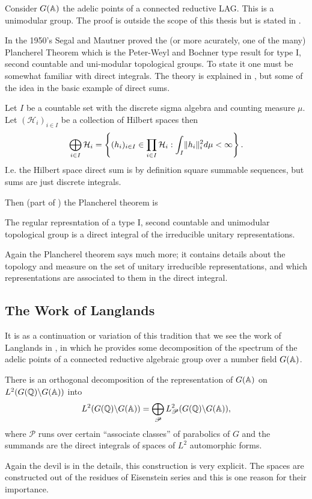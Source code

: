\begin{example}
	Consider \(G(\A)\) the adelic points of a connected reductive LAG. This is a unimodular group. The proof is outside the scope of this thesis but is stated in \cite[Lem. 2]{conradCOMPACTNESSVOLUMEADELIC}.
\end{example}

In the 1950's Segal and Mautner proved the (or more acurately, one of the many) Plancherel Theorem which is the Peter-Weyl and Bochner type result for type I, second countable and uni-modular topological groups. To state it one must be somewhat familiar with direct integrals. The theory is explained in \cite[7.4]{follandCourseAbstractHarmonic2016a}, but some of the idea in the basic example of direct sums.
\begin{example}
	Let \(I\) be a countable set with the discrete sigma algebra and counting measure \(\mu\). Let \((\mathcal{H}_i)_{i\in I}\) be a collection of Hilbert spaces then
	\[\bigoplus_{i\in I} \mathcal{H}_i = \left\{ (h_i)_{i\in I}\in \prod_{i\in I} \mathcal{H}_i : \int_I \lVert h_i \rVert_i^2 d\mu <\infty \right\}.\]
	I.e. the Hilbert space direct sum is by definition square summable sequences, but sums are just discrete integrals.
\end{example}
Then (part of ) the Plancherel theorem is
\begin{Theorem}
	The regular represntation of a type I, second countable and unimodular topological group is a direct integral of the irreducible unitary representations. 
\end{Theorem}
\begin{remark}
	Again the Plancherel theorem says much more; it contains details about the topology and measure on the set of unitary irreducible representations, and which representations are associated to them in the direct integral.
\end{remark}

\subsection{The Work of Langlands}
It is as a continuation or variation of this tradition that we see the work of Langlands in \cite{langlandsFunctionalEquationsSatisfied1976}, in which he provides some decomposition of the spectrum of the adelic points of a connected reductive algebraic group over a number field \(G(\A)\).

\begin{Theorem}
	There is an orthogonal decomposition of the representation of \(G(\A)\) on \(L^2(G(\Q) \backslash G(\A))\) into 
	\[L^2(G(\Q) \backslash G(\A)) = \bigoplus_{\mathscr{P}}L^2_\mathscr{P}(G(\Q) \backslash G(\A)),\]
	where \(\mathscr{P}\) runs over certain ``associate classes'' of parabolics of \(G\) and the summands are the direct integrals of spaces of \(L^2\) automorphic forms.
\end{Theorem}
Again the devil is in the details, this construction is very explicit. The spaces are constructed out of the residues of Eisenstein series and this is one reason for their importance. 

